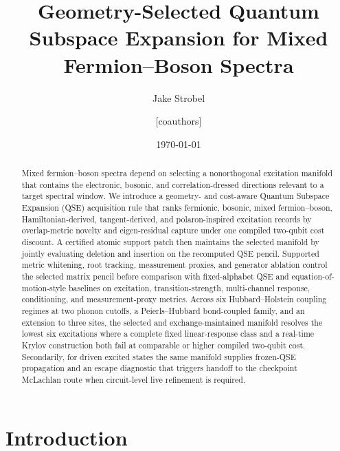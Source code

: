 \documentclass[
  reprint,
  amsmath,
  amssymb,
  aps,
  pra,
  nofootinbib,
  superscriptaddress,
  floatfix
]{revtex4-2}
\newcommand{\placeholder}[1]{\textcolor{red!70!black}{\ifmmode\left[#1\right]\else\textsf{[#1]}\fi}}
\begin{document}
\title{Geometry-Selected Quantum Subspace Expansion for Mixed Fermion--Boson Spectra}

\author{Jake Strobel}
\author{\placeholder{coauthors}}

\date{\today}

\begin{abstract}
Mixed fermion--boson spectra depend on selecting a nonorthogonal excitation manifold that contains the electronic, bosonic, and correlation-dressed directions relevant to a target spectral window.  We introduce a geometry- and cost-aware Quantum Subspace Expansion (QSE) acquisition rule that ranks fermionic, bosonic, mixed fermion--boson, Hamiltonian-derived, tangent-derived, and polaron-inspired excitation records by overlap-metric novelty and eigen-residual capture under one compiled two-qubit cost discount.  A certified atomic support patch then maintains the selected manifold by jointly evaluating deletion and insertion on the recomputed QSE pencil.  Supported metric whitening, root tracking, measurement proxies, and generator ablation control the selected matrix pencil before comparison with fixed-alphabet QSE and equation-of-motion-style baselines on excitation, transition-strength, multi-channel response, conditioning, and measurement-proxy metrics.  Across six Hubbard--Holstein coupling regimes at two phonon cutoffs, a Peierls--Hubbard bond-coupled family, and an extension to three sites, the selected and exchange-maintained manifold resolves the lowest six excitations where a complete fixed linear-response class and a real-time Krylov construction both fail at comparable or higher compiled two-qubit cost.  Secondarily, for driven excited states the same manifold supplies frozen-QSE propagation and an escape diagnostic that triggers handoff to the checkpoint McLachlan route when circuit-level live refinement is required.
\end{abstract}

\maketitle

\section{Introduction}
\end{document}
